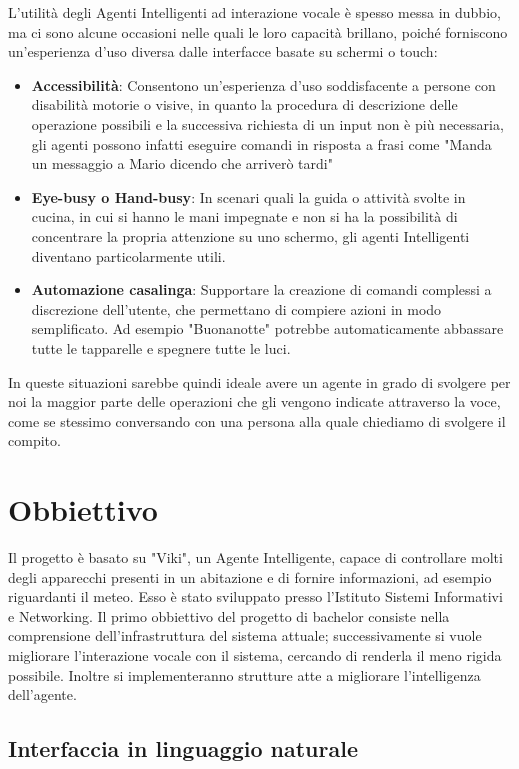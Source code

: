 \documentclass[twoside]{supsistudent}
\begin{document}
L'utilità degli Agenti Intelligenti ad interazione vocale è spesso messa in dubbio, ma ci sono alcune occasioni nelle quali le loro capacità brillano, poiché forniscono un'esperienza d'uso diversa dalle interfacce basate su schermi o touch:
\begin{itemize}
	\item \textbf{Accessibilità}: Consentono un'esperienza d'uso soddisfacente a persone con disabilità motorie o visive, in quanto la procedura di descrizione delle operazione possibili e la successiva richiesta di un input non è più necessaria, gli agenti possono infatti eseguire comandi in risposta a frasi come "Manda un messaggio a Mario dicendo che arriverò tardi"
	\item \textbf{Eye-busy o Hand-busy}: In scenari quali la guida o attività svolte in cucina, in cui si hanno le mani impegnate e non si ha la possibilità di concentrare la propria attenzione su uno schermo, gli agenti Intelligenti diventano particolarmente utili.
	\item \textbf{Automazione casalinga}: Supportare la creazione di comandi complessi a discrezione dell'utente, che permettano di compiere azioni in modo semplificato. Ad esempio "Buonanotte" potrebbe automaticamente abbassare tutte le tapparelle e spegnere tutte le luci.
\end{itemize}
In queste situazioni sarebbe quindi ideale avere un agente in grado di svolgere per noi la maggior parte delle operazioni che gli vengono indicate attraverso la voce, come se stessimo conversando con una persona alla quale chiediamo di svolgere il compito.

\chapter{Obbiettivo}

Il progetto è basato su "Viki", un Agente Intelligente, capace di controllare molti degli apparecchi presenti in un abitazione e di fornire informazioni, ad esempio riguardanti il meteo.\cite{agenteinteligente}
Esso è stato sviluppato presso l'Istituto Sistemi Informativi e Networking. \cite{ISIN}
Il primo obbiettivo del progetto di bachelor consiste nella comprensione dell'infrastruttura del sistema attuale; successivamente si  vuole migliorare l'interazione vocale con il sistema, cercando di renderla il meno rigida possibile. Inoltre si implementeranno strutture atte a migliorare l'intelligenza dell'agente.

\section{Interfaccia in linguaggio naturale}
\end{document}
